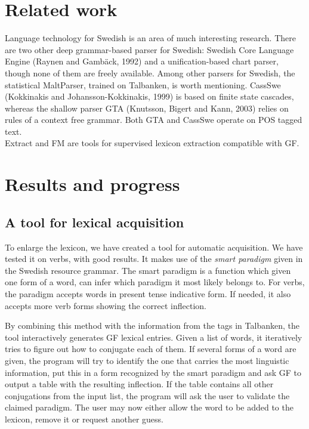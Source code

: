 \documentclass[submission]{eptcs} %
\begin{document}
\section{Related work}
Language technology for Swedish is an area of much interesting research.
There are two other deep grammar-based parser for Swedish:
Swedish Core Language Engine (Raynen and Gambäck, 1992) and a
unification-based chart parser\cite{wiren},
though none of them are freely available.
Among other parsers for Swedish, the statistical MaltParser\cite{malt},
trained on Talbanken, is worth mentioning. 
CassSwe (Kokkinakis and Johansson-Kokkinakis, 1999) is based on finite state cascades,
whereas the shallow parser GTA (Knutsson, Bigert and Kann, 2003) relies on rules of 
a context free grammar. Both GTA and CassSwe operate on POS tagged text.\\
Extract and FM\cite{MarkusForsberg2007} are tools for supervised lexicon
extraction compatible with GF.


\section{Results and progress}
\label{sec:progress}
\subsection{A tool for lexical acquisition}
To enlarge the lexicon, 
we have created a tool for automatic acquisition. We have
tested it on verbs, with good results. It makes use of
the \emph{smart paradigm} given in the Swedish resource grammar.
The smart paradigm is a function which given one form of a word, can
infer which paradigm it most likely belongs to.
For verbs, the paradigm accepts words in present tense indicative form.
If needed, it also accepts more verb forms showing the correct inflection.

By combining this method with the information from the tags in Talbanken,
the tool interactively generates GF lexical entries. 
Given a list of words, it iteratively
tries to figure out how to conjugate each of them. If several forms of a word are 
given, the program will try to identify the one that carries the most linguistic
information, put this in a form recognized by the smart paradigm and ask GF to output
a table with the resulting inflection. 
If the table contains all other conjugations from the input list,
the program will ask the  user to
validate the claimed paradigm. The user may now either
allow the word to be added to the lexicon, remove it or request another guess.
\end{document}
